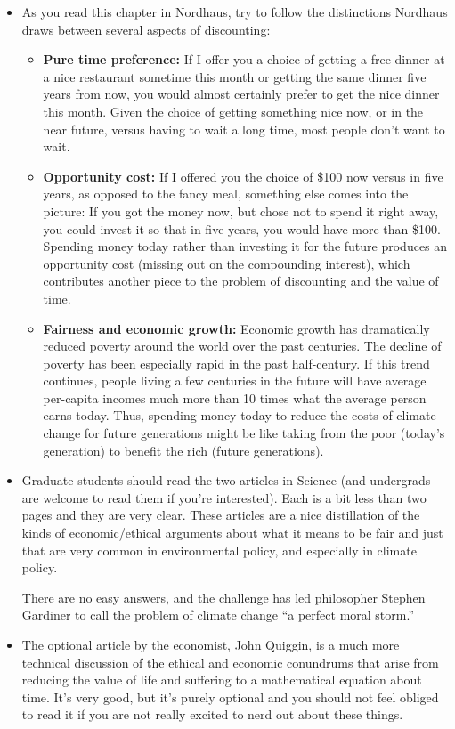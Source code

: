 \documentclass[
]{article}
\providecommand{\tightlist}{%
  \setlength{\itemsep}{0pt}\setlength{\parskip}{0pt}}
\begin{document}
\begin{itemize}
\item
  As you read this chapter in Nordhaus, try to follow the distinctions
  Nordhaus draws between several aspects of discounting:

  \begin{itemize}
  \tightlist
  \item
    \textbf{Pure time preference:} If I offer you a choice of getting a
    free dinner at a nice restaurant sometime this month or getting the
    same dinner five years from now, you would almost certainly prefer
    to get the nice dinner this month. Given the choice of getting
    something nice now, or in the near future, versus having to wait a
    long time, most people don't want to wait.
  \item
    \textbf{Opportunity cost:} If I offered you the choice of \$100 now
    versus in five years, as opposed to the fancy meal, something else
    comes into the picture: If you got the money now, but chose not to
    spend it right away, you could invest it so that in five years, you
    would have more than \$100. Spending money today rather than
    investing it for the future produces an opportunity cost (missing
    out on the compounding interest), which contributes another piece to
    the problem of discounting and the value of time.
  \item
    \textbf{Fairness and economic growth:} Economic growth has
    dramatically reduced poverty around the world over the past
    centuries. The decline of poverty has been especially rapid in the
    past half-century. If this trend continues, people living a few
    centuries in the future will have average per-capita incomes much
    more than 10 times what the average person earns today. Thus,
    spending money today to reduce the costs of climate change for
    future generations might be like taking from the poor (today's
    generation) to benefit the rich (future generations).
  \end{itemize}
\item
  Graduate students should read the two articles in Science (and
  undergrads are welcome to read them if you're interested). Each is a
  bit less than two pages and they are very clear. These articles are a
  nice distillation of the kinds of economic/ethical arguments about
  what it means to be fair and just that are very common in
  environmental policy, and especially in climate policy.

  There are no easy answers, and the challenge has led philosopher
  Stephen Gardiner to call the problem of climate change ``a perfect
  moral storm.''
\item
  The optional article by the economist, John Quiggin, is a much more
  technical discussion of the ethical and economic conundrums that arise
  from reducing the value of life and suffering to a mathematical
  equation about time. It's very good, but it's purely optional and you
  should not feel obliged to read it if you are not really excited to
  nerd out about these things.
\end{itemize}
\end{document}

